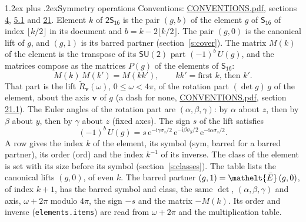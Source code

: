 \documentclass[10pt,a4paper]{article}
\makeatletter
\renewcommand\section{\@startsection{section}{1}{\z@}{-3ex plus -1ex minus -.2ex}%
  {1.2ex plus .2ex}{\normalfont\large\sffamily\bfseries\color{parttitle}}}
\numberwithin{equation}{section}
\newcommand{\eltfont}[1]{{\let\sigma\eltsigma\mathelt{#1}}}
\newcommand{\grp}[1]{\mathsf{#1}}
\newcommand{\elt}[1]{\eltfont{#1}}
\newcommand{\vv}{\mathbf{v}}
\newcommand{\iunit}{\mathrm{i}}
\newcommand{\expe}{\mathrm{e}}
\newcommand{\barred}[1]{\bar{#1}}
\newcommand{\lift}[1]{\tilde{#1}}
\newcommand{\pauli}[1]{\sigma_{#1}}
\makeatother
\begin{document}
\section{Symmetry operations}\label{s:elements}
Conventions: \href{../../CONVENTIONS.pdf}{CONVENTIONS.pdf}, sections \href{../../../rotation/CONVENTIONS.pdf\#conv.4}{4}, \href{../../../rotation/CONVENTIONS.pdf\#conv.5.1}{5.1} and \href{../../CONVENTIONS.pdf\#conv.21}{21}.
\leavevmode\label{n:index.element}\label{n:element.g}Element $k$ of $\grp{2S_{16}}$ is the pair $(g, b)$ of the element $g$ of \href{../../../rotation/data/pdf/S16.pdf}{$\grp{S_{16}}$} of index $\lfloor k/2\rfloor$ in its document and $b = k - 2\lfloor k/2\rfloor$. The pair $(g, 0)$ is the canonical lift of $g$, and $(g, 1)$ is its barred partner (section~\ref{s:cover}). \label{n:matrix.element.pin}\label{n:matrix.element}The matrix $M(k)$ of the element is the transpose of its $\grp{SU(2)}$ part $(-1)^{b}\,U(g)$, and the matrices compose as the matrices $P(g)$ of the elements of $\grp{S_{16}}$:
\begin{equation}\label{e:mprod}M(k)\,M(k') = M(kk'),\qquad kk' = \text{first } k\text{, then } k'.\end{equation}
\leavevmode\label{n:angle.omega}\label{n:vector.axis}\label{n:vector.pole}That part is the lift $\lift{R}_{\vv}(\omega)$, $0 \le \omega < 4\pi$, of the rotation part $(\det g)\,g$ of the element, about the axis $\vv$ of $g$ (a dash for none, \href{../../CONVENTIONS.pdf}{CONVENTIONS.pdf}, section \href{../../CONVENTIONS.pdf\#conv.21.1}{21.1}). \label{n:angle.euler.alpha}\label{n:angle.euler.beta}\label{n:angle.euler.gamma}\label{n:vector.coordinates}The Euler angles of the rotation part are $(\alpha,\beta,\gamma)$: by $\alpha$ about $z$, then by $\beta$ about $y$, then by $\gamma$ about $z$ (fixed axes). \label{n:local.euler.sign}The sign $s$ of the lift satisfies
\begin{equation}\label{e:euler}(-1)^{b}\,U(g) = s\,\expe^{-\iunit\gamma\pauli{z}/2}\,\expe^{-\iunit\beta\pauli{y}/2}\,\expe^{-\iunit\alpha\pauli{z}/2}.\end{equation}
\leavevmode\label{n:index.element.inverse}\label{n:head.sym}\label{n:head.ord}A row gives the index $k$ of the element, its symbol (sym, barred for a barred partner), its order (ord) and the index $k^{-1}$ of its inverse. \label{n:head.class}The class of the element is set with its size before its symbol (section~\ref{s:classes}).
The table lists the canonical lifts $(g, 0)$, of even $k$. The barred partner $(g, 1) = \elt{\barred{E}}\,(g, 0)$, of index $k + 1$, has the barred symbol and class, the same $\det$, $(\alpha,\beta,\gamma)$ and axis, $\omega + 2\pi$ modulo $4\pi$, the sign $-s$ and the matrix $-M(k)$. Its order and inverse (\texttt{elements.items}) are read from $\omega + 2\pi$ and the multiplication table.
\end{document}
